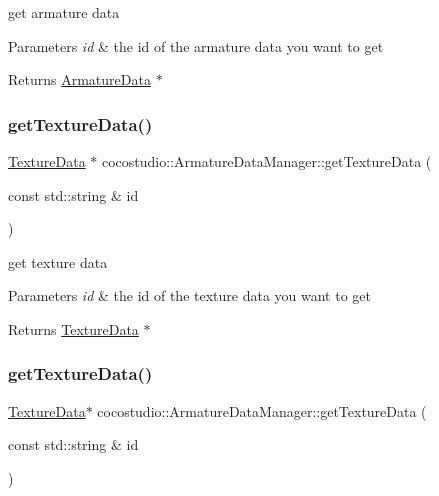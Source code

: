 get armature data 


\begin{DoxyParams}{Parameters}
{\em id} & the id of the armature data you want to get \\
\hline
\end{DoxyParams}
\begin{DoxyReturn}{Returns}
\hyperlink{classcocostudio_1_1ArmatureData}{Armature\+Data} $\ast$ 
\end{DoxyReturn}
\mbox{\label{classcocostudio_1_1ArmatureDataManager_a8d464fbdee16e338481824a7e3725d11}} 
\subsubsection{\texorpdfstring{get\+Texture\+Data()}{getTextureData()}\hspace{0.1cm}{\footnotesize\ttfamily [1/2]}}
{\footnotesize\ttfamily \hyperlink{classcocostudio_1_1TextureData}{Texture\+Data} $\ast$ cocostudio\+::\+Armature\+Data\+Manager\+::get\+Texture\+Data (\begin{DoxyParamCaption}\item[{const std\+::string \&}]{id }\end{DoxyParamCaption})}



get texture data 


\begin{DoxyParams}{Parameters}
{\em id} & the id of the texture data you want to get \\
\hline
\end{DoxyParams}
\begin{DoxyReturn}{Returns}
\hyperlink{classcocostudio_1_1TextureData}{Texture\+Data} $\ast$ 
\end{DoxyReturn}
\mbox{\label{classcocostudio_1_1ArmatureDataManager_a5516347b007b20f6a6f685a630ba76b1}} 
\subsubsection{\texorpdfstring{get\+Texture\+Data()}{getTextureData()}\hspace{0.1cm}{\footnotesize\ttfamily [2/2]}}
{\footnotesize\ttfamily \hyperlink{classcocostudio_1_1TextureData}{Texture\+Data}$\ast$ cocostudio\+::\+Armature\+Data\+Manager\+::get\+Texture\+Data (\begin{DoxyParamCaption}\item[{const std\+::string \&}]{id }\end{DoxyParamCaption})}



